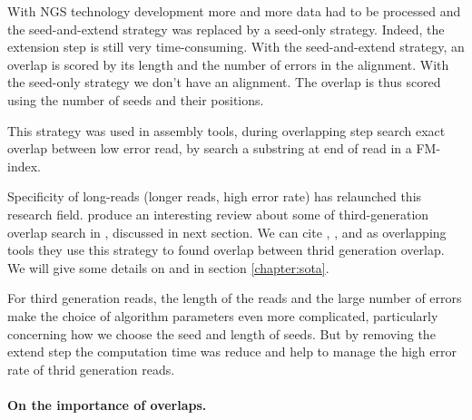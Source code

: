 \documentclass[main.tex]{subfiles}
\begin{document}
With NGS technology development more and more data had to be processed and the seed-and-extend strategy was replaced by a seed-only strategy. Indeed, the extension step is still very time-consuming. With the seed-and-extend strategy, an overlap is scored by its length and the number of errors in the alignment. With the seed-only strategy we don't have an alignment. The overlap is thus scored using the number of seeds and their positions. 

This strategy was used in  \cite{SGA} assembly tools, during overlapping step  search exact overlap between low error read, by search a substring at end of read in a FM-index. 

Specificity of long-reads (longer reads, high error rate) has relaunched this research field. \citeauthor{ovl_bench} produce an interesting review about some of third-generation overlap search in \cite{ovl_bench}, discussed in next section. 
We can cite  \cite{hisea},  \cite{daligner}, \mhap \cite{canu} and \minimap \cite{minimap, minimap2} as overlapping tools they use this strategy to found overlap between thrid generation overlap. We will give some details on \mhap and \minimap in section \ref{chapter:sota}.

For third generation reads, the length of the reads and the large number of errors make the choice of algorithm parameters even more complicated, particularly concerning how we choose the seed and length of seeds. But by removing the extend step the computation time was reduce and help to manage the high error rate of thrid generation reads.

\paragraph{On the importance of overlaps.}
\end{document}
